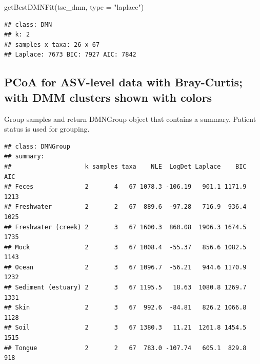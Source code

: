 \documentclass[
]{book}
\newenvironment{Shaded}{\begin{snugshade}}{\end{snugshade}}
\newcommand{\AttributeTok}[1]{\textcolor[rgb]{0.77,0.63,0.00}{#1}}
\newcommand{\DecValTok}[1]{\textcolor[rgb]{0.00,0.00,0.81}{#1}}
\newcommand{\FunctionTok}[1]{\textcolor[rgb]{0.00,0.00,0.00}{#1}}
\newcommand{\NormalTok}[1]{#1}
\newcommand{\OtherTok}[1]{\textcolor[rgb]{0.56,0.35,0.01}{#1}}
\newcommand{\SpecialCharTok}[1]{\textcolor[rgb]{0.00,0.00,0.00}{#1}}
\newcommand{\StringTok}[1]{\textcolor[rgb]{0.31,0.60,0.02}{#1}}
\begin{document}
\begin{Shaded}
\begin{Highlighting}[]
\FunctionTok{getBestDMNFit}\NormalTok{(tse\_dmn, }\AttributeTok{type =} \StringTok{"laplace"}\NormalTok{)}
\end{Highlighting}
\end{Shaded}

\begin{verbatim}
## class: DMN 
## k: 2 
## samples x taxa: 26 x 67 
## Laplace: 7673 BIC: 7927 AIC: 7842
\end{verbatim}

\hypertarget{pcoa-for-asv-level-data-with-bray-curtis-with-dmm-clusters-shown-with-colors}{%
\subsection{PCoA for ASV-level data with Bray-Curtis; with DMM clusters shown with colors}\label{pcoa-for-asv-level-data-with-bray-curtis-with-dmm-clusters-shown-with-colors}}

Group samples and return DMNGroup object that contains a summary.
Patient status is used for grouping.

\begin{Shaded}
\end{Shaded}

\begin{verbatim}
## class: DMNGroup 
## summary:
##                    k samples taxa    NLE  LogDet Laplace    BIC  AIC
## Feces              2       4   67 1078.3 -106.19   901.1 1171.9 1213
## Freshwater         2       2   67  889.6  -97.28   716.9  936.4 1025
## Freshwater (creek) 2       3   67 1600.3  860.08  1906.3 1674.5 1735
## Mock               2       3   67 1008.4  -55.37   856.6 1082.5 1143
## Ocean              2       3   67 1096.7  -56.21   944.6 1170.9 1232
## Sediment (estuary) 2       3   67 1195.5   18.63  1080.8 1269.7 1331
## Skin               2       3   67  992.6  -84.81   826.2 1066.8 1128
## Soil               2       3   67 1380.3   11.21  1261.8 1454.5 1515
## Tongue             2       2   67  783.0 -107.74   605.1  829.8  918
\end{verbatim}
\end{document}
